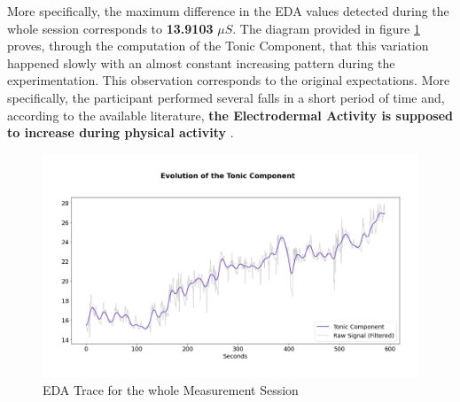 More specifically, the maximum difference in the EDA values detected during the whole session corresponds to \textbf{13.9103} $\mu S$. The diagram provided in figure \ref{fig:movisens-global} proves, through the computation of the Tonic Component, that this variation happened slowly with an almost constant increasing pattern during the experimentation. This observation corresponds to the original expectations. More specifically, the participant performed several falls in a short period of time and, according to the available literature, \textbf{the Electrodermal Activity is supposed to increase during physical activity} \cite{eda-interval-4}.

\vspace{15mm}

\begin{figure}[h]
    \centering
    \includegraphics[width=\textwidth]{./images/movisens/Global.png}
    \caption{EDA Trace for the whole Measurement Session}
    \label{fig:movisens-global}
\end{figure}
